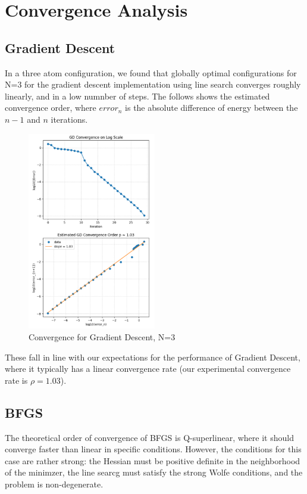 \documentclass[11pt,onecolumn]{article}
\begin{document}
\newpage
\section{Convergence Analysis}
\subsection{Gradient Descent}

In a three atom configuration, we found that globally optimal configurations for N=3 for the gradient descent implementation using line search converges roughly linearly, and in a low numnber of steps. The follows shows the estimated convergence order, where $error_{n}$ is the absolute difference of energy between the $n-1$ and $n$ iterations. 

\begin{figure}[h]
  \centering
  \includegraphics[width=0.5\textwidth]{./GD_conv_uniform.png}
  \caption{Convergence for Gradient Descent, N=3}
\end{figure}


\noindent
These fall in line with our expectations for the performance of Gradient Descent, where it typically has a linear convergence rate (our experimental convergence rate is $\rho=1.03$).

\newpage
\subsection{BFGS}

The theoretical order of convergence of BFGS is Q-superlinear, where it should converge faster than linear in specific conditions. However, the conditions for this case are rather strong: the Hessian must be positive definite in the neighborhood of the minimzer, the line searcg must satisfy the strong Wolfe conditions, and the problem is non-degenerate.  
\end{document}
